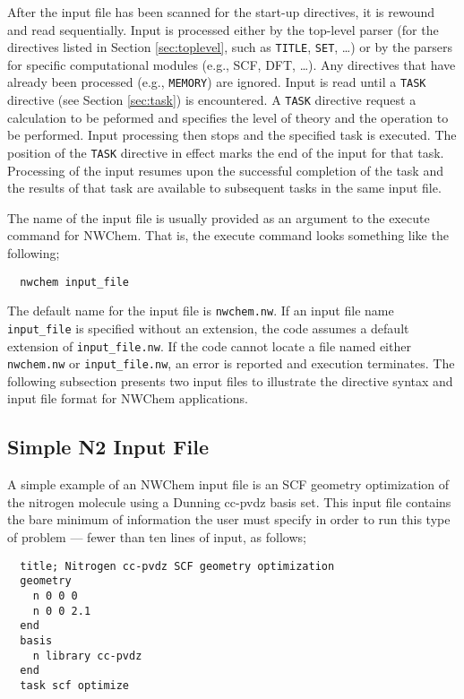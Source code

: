 After the input file has been scanned for the start-up directives, it
is rewound and read sequentially.  Input is processed either by the
top-level parser (for the directives listed in Section
\ref{sec:toplevel}, such as \verb+TITLE+, \verb+SET+, \ldots) or by
the parsers for specific computational modules (e.g., SCF, DFT,
\ldots).  Any directives that have already been processed (e.g.,
\verb+MEMORY+) are ignored.  Input is read until a \verb+TASK+
directive (see Section \ref{sec:task}) is encountered.  A \verb+TASK+
directive request a calculation to be peformed and specifies the level
of theory and the operation to be performed.  Input processing then
stops and the specified task is executed.  The position of the
\verb+TASK+ directive in effect marks the end of the input for that
task.  Processing of the input resumes upon the successful completion
of the task and the results of that task are available to subsequent
tasks in the same input file.

The name of the input file is usually provided as an argument to the
execute command for NWChem.  That is, the execute command looks
something like the following;

\begin{verbatim}
  nwchem input_file
\end{verbatim}

The default name for the input file is \verb+nwchem.nw+.  If an input
file name \verb+input_file+ is specified without an extension, the code
assumes a default extension of \verb+input_file.nw+.  If the code cannot
locate a file named either \verb+nwchem.nw+ or \verb+input_file.nw+, an 
error is reported and execution terminates.  The following
subsection presents two input files to illustrate the directive syntax and 
input file format for NWChem applications.

\subsection{Simple N2 Input File}
\label{sec:simplesample}

A simple example of an NWChem input file is an SCF geometry optimization of
the nitrogen molecule using a Dunning cc-pvdz basis set.  This input
file contains the bare minimum of information the user must specify in
order to run this type of problem --- fewer than ten lines of input,
as follows;
\begin{verbatim}
  title; Nitrogen cc-pvdz SCF geometry optimization
  geometry 
    n 0 0 0
    n 0 0 2.1
  end
  basis
    n library cc-pvdz
  end
  task scf optimize
\end{verbatim}


